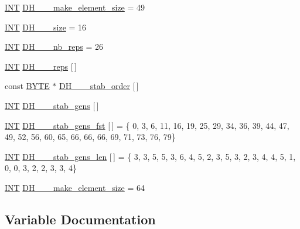 \begin{DoxyCompactItemize}
\item 
\mbox{\hyperlink{galois_8h_a09fddde158a3a20bd2dcadb609de11dc}{I\+NT}} \mbox{\hyperlink{data___d_h_8_c_a3a5e9d83c8a825ee38dda2932da643cd}{D\+H\+\_\+\_\+\_\+make\+\_\+element\+\_\+size}} = 49
\item 
\mbox{\hyperlink{galois_8h_a09fddde158a3a20bd2dcadb609de11dc}{I\+NT}} \mbox{\hyperlink{data___d_h_8_c_acc9f695e62f210df7664d2023d09e577}{D\+H\+\_\+\_\+\_\+size}} = 16
\item 
\mbox{\hyperlink{galois_8h_a09fddde158a3a20bd2dcadb609de11dc}{I\+NT}} \mbox{\hyperlink{data___d_h_8_c_ab49ed16857b57446a912cfee0aaa6af0}{D\+H\+\_\+\_\+\_\+nb\+\_\+reps}} = 26
\item 
\mbox{\hyperlink{galois_8h_a09fddde158a3a20bd2dcadb609de11dc}{I\+NT}} \mbox{\hyperlink{data___d_h_8_c_a17fb07b133332819b9cc7a241058a35d}{D\+H\+\_\+\_\+\_\+reps}} \mbox{[}$\,$\mbox{]}
\item 
const \mbox{\hyperlink{galois_8h_ab6cc7b4aeb6ea31aba2b3fbfc83ff5e6}{B\+Y\+TE}} $\ast$ \mbox{\hyperlink{data___d_h_8_c_ab757c8126e889d4d28d19e9531a1178f}{D\+H\+\_\+\_\+\_\+stab\+\_\+order}} \mbox{[}$\,$\mbox{]}
\item 
\mbox{\hyperlink{galois_8h_a09fddde158a3a20bd2dcadb609de11dc}{I\+NT}} \mbox{\hyperlink{data___d_h_8_c_aea149ef4b6e6e36f0ea6fd11c64d5892}{D\+H\+\_\+\_\+\_\+stab\+\_\+gens}} \mbox{[}$\,$\mbox{]}
\item 
\mbox{\hyperlink{galois_8h_a09fddde158a3a20bd2dcadb609de11dc}{I\+NT}} \mbox{\hyperlink{data___d_h_8_c_a70ba4d771abedca6044ca1d7cc968600}{D\+H\+\_\+\_\+\_\+stab\+\_\+gens\+\_\+fst}} \mbox{[}$\,$\mbox{]} = \{ 0, 3, 6, 11, 16, 19, 25, 29, 34, 36, 39, 44, 47, 49, 52, 56, 60, 65, 66, 66, 66, 69, 71, 73, 76, 79\}
\item 
\mbox{\hyperlink{galois_8h_a09fddde158a3a20bd2dcadb609de11dc}{I\+NT}} \mbox{\hyperlink{data___d_h_8_c_a8e10a1cbb48044850026e832a65c30ec}{D\+H\+\_\+\_\+\_\+stab\+\_\+gens\+\_\+len}} \mbox{[}$\,$\mbox{]} = \{ 3, 3, 5, 5, 3, 6, 4, 5, 2, 3, 5, 3, 2, 3, 4, 4, 5, 1, 0, 0, 3, 2, 2, 3, 3, 4\}
\item 
\mbox{\hyperlink{galois_8h_a09fddde158a3a20bd2dcadb609de11dc}{I\+NT}} \mbox{\hyperlink{data___d_h_8_c_a2b31c213b79d3552482e68ab1e64291b}{D\+H\+\_\+\_\+\_\+make\+\_\+element\+\_\+size}} = 64
\end{DoxyCompactItemize}


\subsection{Variable Documentation}
\mbox{\label{data___d_h_8_c_a3a5e9d83c8a825ee38dda2932da643cd}} 
